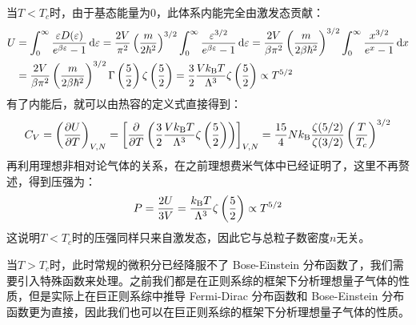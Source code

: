 当$T<T_c$时，由于基态能量为0，此体系内能完全由激发态贡献：
\[\begin{aligned}
U&=\int_0^{\infty}\frac{\varepsilon D(\varepsilon)}{e^{\beta\varepsilon}-1}\dd{\varepsilon}
=\frac{2V}{\pi^2}\left(\frac{m}{2\hbar^2}\right)^{3/2}\int_0^{\infty}\frac{\varepsilon^{3/2}}{e^{\beta\varepsilon}-1}\dd{\varepsilon}=\frac{2V}{\beta\pi^2}\left(\frac{m}{2\beta\hbar^2}\right)^{3/2}\int_0^{\infty}\frac{x^{3/2}}{e^x-1}\dd{x}\\
&=\frac{2V}{\beta\pi^2}\left(\frac{m}{2\beta\hbar^2}\right)^{3/2}\Gamma\left(\frac{5}{2}\right)\zeta\left(\frac{5}{2}\right)=\frac{3}{2}\frac{Vk_{\rm B}T}{\Lambda^3}\zeta\left(\frac{5}{2}\right)\propto T^{5/2}
\end{aligned}\]
有了内能后，就可以由热容的定义式直接得到：
\[C_V=\left(\pdv{U}{T}\right)_{V,N}=\left[\pdv{}{T}\left(\frac{3}{2}\frac{Vk_{\rm B}T}{\Lambda^3}\zeta\left(\frac{5}{2}\right)\right)\right]_{V,N}=\frac{15}{4}Nk_{\rm B}\frac{\zeta(5/2)}{\zeta(3/2)}\left(\frac{T}{T_c}\right)^{3/2}\]
再利用理想非相对论气体的关系，在之前理想费米气体中已经证明了，这里不再赘述，得到压强为：
\[P=\frac{2U}{3V}=\frac{k_{\rm B}T}{\Lambda^3}\zeta\left(\frac{5}{2}\right)\propto T^{5/2}\]
这说明$T<T_c$时的压强同样只来自激发态，因此它与总粒子数密度$n$无关。

当$T>T_c$时，此时常规的微积分已经降服不了 Bose-Einstein 分布函数了，我们需要引入特殊函数来处理。之前我们都是在正则系综的框架下分析理想量子气体的性质，但是实际上在巨正则系综中推导 Fermi-Dirac 分布函数和 Bose-Einstein 分布函数更为直接，因此我们也可以在巨正则系综的框架下分析理想量子气体的性质。

